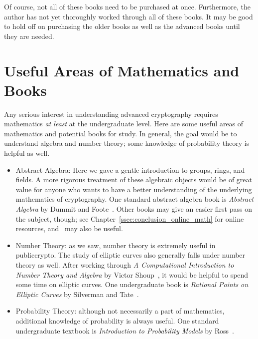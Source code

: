 \noindent
Of course, not all of these books need to be purchased at once.
Furthermore, the author has not yet thoroughly worked through
all of these books.
It may be good to hold off on purchasing the older books
as well as the advanced books until they are needed.



\section{Useful Areas of Mathematics and Books}

Any serious interest
in understanding advanced cryptography requires mathematics
\emph{at least} at the undergraduate level.
Here are some useful areas of mathematics and potential books for study.
In general, the goal would be to understand algebra and \gls{number theory};
some knowledge of probability theory is helpful as well.

\begin{itemize}
\item Abstract Algebra: Here we gave a gentle introduction
    to \glspl{group}, \glspl{ring}, and \glspl{field}.
    A more rigorous treatment of these algebraic objects would
    be of great value for anyone who wants to have a better understanding
    of the underlying mathematics of cryptography.
    One standard abstract algebra book is
    \emph{Abstract Algebra} by Dummit and Foote~\cite{DummitFooteAlgebra}.
    Other books may give an easier first pass on the subject, though;
    see Chapter~\ref{ssec:conclusion_online_math} for online resources,
    and~\cite{ComputationalIntroNTA} may also be useful.

\item Number Theory: as we saw, \gls{number theory} is extremely useful
    in \gls{publiccrypto}.
    The study of \glspl{elliptic curve} also generally falls under
    \gls{number theory} as well.
    After working through
    \emph{A Computational Introduction to Number Theory and Algebra}
    by Victor Shoup~\cite{ComputationalIntroNTA},
    it would be helpful to spend some time on \glspl{elliptic curve}.
    One undergraduate book is \emph{Rational Points on Elliptic Curves} by
    Silverman and Tate~\cite{RationalPointsEC}.
\item Probability Theory: although not necessarily a part of mathematics,
    additional knowledge of probability is always useful.
    One standard undergraduate textbook is
    \emph{Introduction to Probability Models} by Ross~\cite{IntroProbModels}.
\end{itemize}

